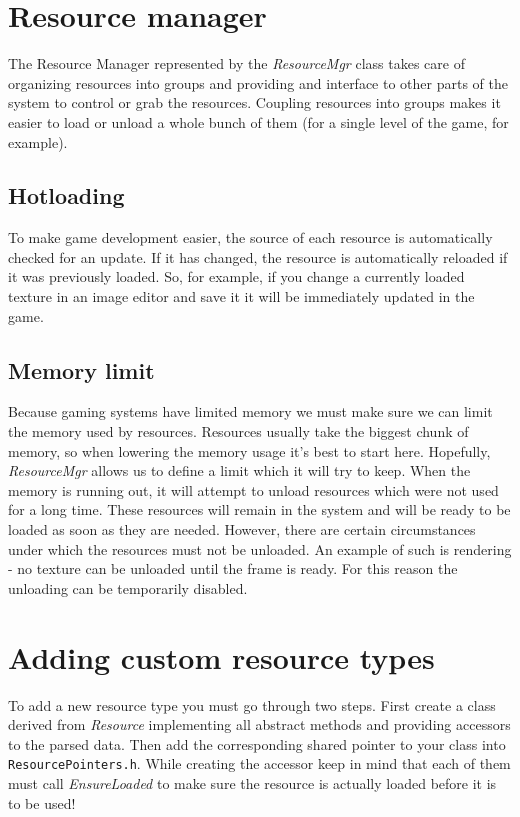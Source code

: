 \section{Resource manager}
The Resource Manager represented by the \emph{ResourceMgr} class takes care of organizing resources into groups and providing and interface to other parts of the system to control or grab the resources. Coupling resources into groups makes it easier to load or unload a whole bunch of them (for a single level of the game, for example).

\subsection{Hotloading}
To make game development easier, the source of each resource is automatically checked for an update. If it has changed, the resource is automatically reloaded if it was previously loaded. So, for example, if you change a currently loaded texture in an image editor and save it it will be immediately updated in the game.

\subsection{Memory limit}
Because gaming systems have limited memory we must make sure we can limit the memory used by resources. Resources usually take the biggest chunk of memory, so when lowering the memory usage it's best to start here. Hopefully, \emph{ResourceMgr} allows us to define a limit which it will try to keep. When the memory is running out, it will attempt to unload resources which were not used for a long time. These resources will remain in the system and will be ready to be loaded as soon as they are needed. However, there are certain circumstances under which the resources must not be unloaded. An example of such is rendering - no texture can be unloaded until the frame is ready. For this reason the unloading can be temporarily disabled.


\section{Adding custom resource types}
To add a new resource type you must go through two steps. First create a class derived from \emph{Resource} implementing all abstract methods and providing accessors to the parsed data. Then add the corresponding shared pointer to your class into \verb'ResourcePointers.h'. While creating the accessor keep in mind that each of them must call \emph{EnsureLoaded} to make sure the resource is actually loaded before it is to be used!



